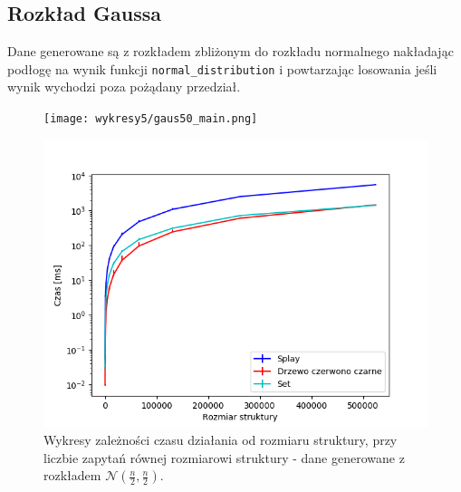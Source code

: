 \documentclass[declaration,shortabstract]{iithesis}
\theoremstyle{thm}
\theoremstyle{remark}
\theoremstyle{plain}
\theoremstyle{plain}
\theoremstyle{plain}
\begin{document}
\subsection{Rozkład Gaussa}
Dane generowane są z rozkładem zbliżonym do rozkładu normalnego nakładając podłogę na wynik funkcji \texttt{normal\_distribution} i powtarzając losowania jeśli wynik wychodzi poza pożądany przedział.
\begin{figure}[H]
\begin{minipage}[b]{.45\textwidth}
\centering
\texttt{[image: wykresy5/gaus50\_main.png]}
\end{minipage}
\hfill
\begin{minipage}[b]{.45\textwidth}
\centering
\includegraphics[width=1\textwidth]{wykresy3/gaus50_main.png}
\end{minipage}
\caption{Wykresy zależności czasu działania od rozmiaru struktury, przy liczbie zapytań równej rozmiarowi struktury - dane generowane z rozkładem \(\mathcal{N}(\frac{n}{2}, \frac{n}{2})\).}
\end{figure}
\end{document}
